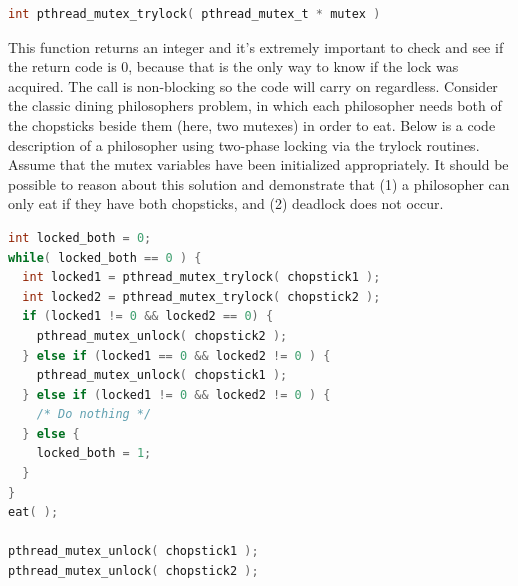 \begin{lstlisting}[language=C]
int pthread_mutex_trylock( pthread_mutex_t * mutex )
\end{lstlisting}

This function returns an integer and it's extremely important to check and see if the return code is 0, because that is the only way to know if the lock was acquired. The call is non-blocking so the code will carry on regardless. Consider the classic dining philosophers problem, in which each philosopher needs both of the chopsticks beside them (here, two mutexes) in order to eat. Below is a code description of a philosopher using two-phase locking via the trylock routines. Assume that the mutex variables have been initialized appropriately. It should be possible to reason about this solution and demonstrate that (1) a philosopher can only eat if they have both chopsticks, and (2) deadlock does not occur.

\begin{lstlisting}[language=C]
int locked_both = 0;
while( locked_both == 0 ) {
  int locked1 = pthread_mutex_trylock( chopstick1 );
  int locked2 = pthread_mutex_trylock( chopstick2 );
  if (locked1 != 0 && locked2 == 0) {
    pthread_mutex_unlock( chopstick2 );
  } else if (locked1 == 0 && locked2 != 0 ) {
    pthread_mutex_unlock( chopstick1 );
  } else if (locked1 != 0 && locked2 != 0 ) {
    /* Do nothing */
  } else {
    locked_both = 1;
  }
}
eat( );

pthread_mutex_unlock( chopstick1 );
pthread_mutex_unlock( chopstick2 );
\end{lstlisting}




